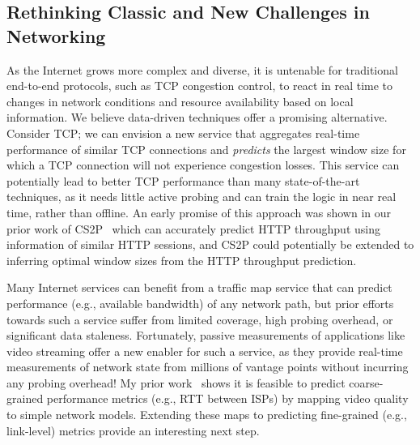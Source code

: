 \subsection{Rethinking Classic and New Challenges in Networking}
\label{subsec:concl:future:rethinking}


As the Internet grows more complex and diverse, it is untenable for traditional end-to-end 
protocols, such as TCP congestion control, to react in real time to changes in network 
conditions and resource availability based on local information. We believe data-driven 
techniques offer a promising alternative. Consider TCP; we can envision a new service 
that aggregates real-time performance of similar TCP connections and {\em predicts} 
the largest window size for which a TCP connection will not experience congestion losses.
This service can potentially lead to better TCP performance than many state-of-the-art 
techniques, as it needs little active probing and can train the logic in near real time, 
rather than offline. An early promise of this approach was shown in our prior work of 
CS2P~\cite{cs2p} which can accurately predict HTTP throughput using information of 
similar HTTP sessions, and CS2P could potentially be extended to inferring optimal window 
sizes from the HTTP throughput prediction.

Many Internet services can benefit from a traffic map service that can predict performance 
(e.g., available bandwidth) of any network path, but prior efforts towards such a service suffer 
from limited coverage, high probing overhead, or significant data staleness. 
Fortunately, passive measurements of applications like video streaming offer a new enabler 
for such a service, as they provide real-time measurements of network state from millions of 
vantage points without incurring any probing overhead!
My prior work~\cite{via,sun2014using} shows it is feasible to predict coarse-grained 
performance metrics (e.g., RTT between ISPs) by mapping video quality to simple network 
models. Extending these maps to predicting fine-grained (e.g., link-level) metrics provide 
an interesting next step.

